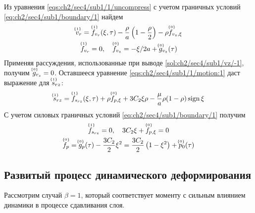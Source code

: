 Из уравнения \cref{eqs:ch2/sec4/sub1/1/uncompress} с учетом граничных условий \cref{eq:ch2/sec4/sub1/boundary/1} найдем
\begin{gather*}
  \uindex{v}{1}_{r} = \uindex{f}{1}_{v_{r}}(\xi, \tau) - \frac{\rho}{a}\left(1-\frac{\rho}{2}\right) -\rho \uindex{f}{0}_{v_{z},\xi}
  \\
  \uindex{f}{1}_{v_{r}} = 0, \quad \uindex{f}{0}_{v_{z}}= -\xi / 2a + \uindex{g}{0}_{v_{z}}(\tau)
\end{gather*}
Применяя рассуждения, использованные при выводе \cref{sol:ch2/sec4/sub1/vz/-1}, получим $\uindex{g}{0}_{v_{z}} = 0$. Оставшееся уравнение \cref{eqs:ch2/sec4/sub1/1/motion:1} даст выражение для $\uindex{s}{1}_{rz}$:
\begin{equation*}
  \uindex{s}{1}_{rz} = \uindex{f}{1}_{s_{rz}}(\xi, \tau) + \rho \uindex{f}{0}_{p,\xi} + 3C_2 \xi \rho - \frac{\mu}{a}\rho(1-\rho)\sign\xi
\end{equation*}
С учетом силовых граничных условий \cref{eq:ch2/sec4/sub1/boundary/1} получим
\begin{gather*}
  \uindex{f}{1}_{s_{rz}} = 0, \quad
  3C_2 \xi + \uindex{f}{0}_{p,\xi} = 0
  \\
  \uindex{f}{0}_{p} = \uindex{g}{0}_{p}(\tau) - \frac{3 C_2}{2} \xi^2 = \frac{3 C_2}{2}\left(1-\xi^2\right) + \uindex{p}{0}_{0}(\tau)
\end{gather*}
\subsection{Развитый процесс динамического деформирования}\label{subsec:ch2/sec4/sub2}

Рассмотрим случай $\beta=1$, который соответствует моменту с сильным влиянием динамики в процессе сдавливания слоя.


